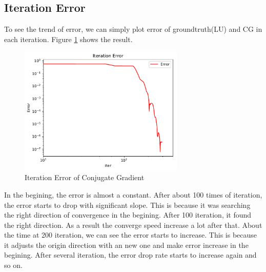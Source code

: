 \documentclass{article}
\begin{document}
\subsection{Iteration Error}
To see the trend of error, we can simply plot error of groundtruth(LU) and CG in each iteration. Figure \ref{fig:iter error} shows the result.
\begin{figure}[H]
	\centering
	\includegraphics[width=0.7\textwidth]{src/iter_error.pdf}
	\caption{Iteration Error of Conjugate Gradient}
	\label{fig:iter error}
\end{figure}
In the begining, the error is almost a constant. After about 100 times of iteration, the error starts to drop with significant slope. This is 
because it was searching the right direction of convergence in the begining. After 100 iteration, it found the right direction. As a result
the converge speed increase a lot after that. About the time at 200 iteration, we can see the error starts to increase. This is because it 
adjusts the origin direction with an new one and make error increase in the begining. After several iteration, the error drop rate starts to
increase again and so on.
\end{document}
